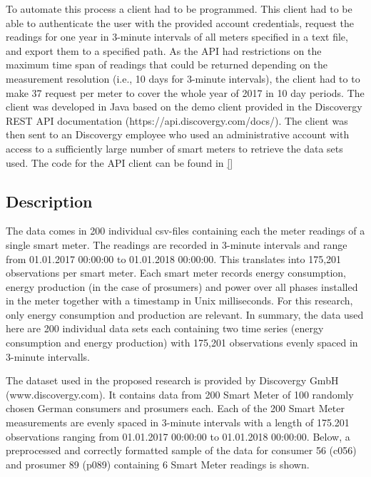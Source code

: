 To automate this process a client had to be programmed. This client  had to be able to authenticate the user with the provided account credentials, request the readings for one year in 3-minute intervals of all meters specified in a text file, and export them to a specified path. As the API had restrictions on the maximum time span of readings that could be returned depending on the measurement resolution (i.e., 10 days for 3-minute intervals), the client had to to make 37 request per meter to cover the whole year of 2017 in 10 day periods. The client was developed in Java based on the demo client provided in the Discovergy REST API documentation (https://api.discovergy.com/docs/). The client was then sent to an Discovergy employee who used an administrative account with access to a sufficiently large number of smart meters to retrieve the data sets used. The code for the API client can be found in \ref{}


\subsection{Description}\label{Sec:Data;Subsec:Description}

The data comes in 200 individual csv-files containing each the meter readings of a single smart meter. The readings are recorded in 3-minute intervals and range from 01.01.2017 00:00:00 to 01.01.2018 00:00:00. This translates into 175,201 observations per smart meter. Each smart meter records  energy consumption,  energy production (in the case of prosumers) and power over all phases installed in the meter together with a timestamp in Unix milliseconds. For this research, only energy consumption and production are relevant. In summary, the data used here are 200 individual data sets each containing two time series (energy consumption and energy production) with 175,201 observations evenly spaced in 3-minute intervalls.

The dataset used in the proposed research is provided by Discovergy GmbH (www.discovergy.com). It contains data from 200 Smart Meter of 100 randomly chosen German consumers and prosumers each. Each of the 200 Smart Meter measurements are evenly spaced in 3-minute intervals with a length of 175.201 observations ranging from 01.01.2017 00:00:00 to 01.01.2018 00:00:00.
Below, a preprocessed and correctly formatted sample of the data for consumer 56 (c056) and prosumer 89 (p089) containing 6 Smart Meter readings is shown.

